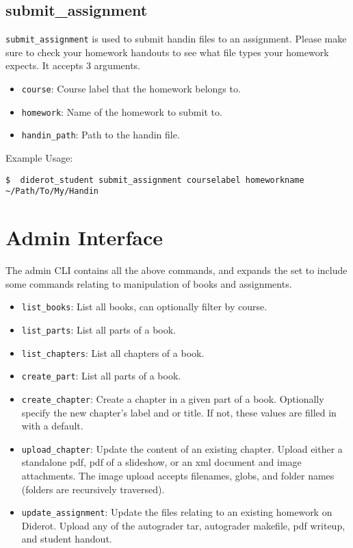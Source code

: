 \subsection{submit\_assignment}

\verb|submit_assignment| is used to submit handin files to an assignment.
%
Please make sure to check your homework handouts to see what file types
your homework expects.
%
It accepts 3 arguments.

\begin{itemize}
  \item \verb|course|: Course label that the homework belongs to.
  \item \verb|homework|: Name of the homework to submit to.
  \item \verb|handin_path|: Path to the handin file.
\end{itemize}

Example Usage:
\begin{verbatim}
$  diderot_student submit_assignment courselabel homeworkname ~/Path/To/My/Handin
\end{verbatim}

\section{Admin Interface}

The admin CLI contains all the above commands, and expands the set to include
some commands relating to manipulation of books and assignments.

\begin{itemize}
  \item \verb|list_books|: List all books, can optionally filter by course.
  \item \verb|list_parts|: List all parts of a book.
  \item \verb|list_chapters|: List all chapters of a book.
  \item \verb|create_part|: List all parts of a book.
  \item \verb|create_chapter|: Create a chapter in a given part of a
    book. Optionally specify the new chapter's label and or title. If
    not, these values are filled in with a default.

  \item \verb|upload_chapter|: Update the content of an existing
    chapter. Upload either a standalone pdf, pdf of a slideshow, or an
    xml document and image attachments.  The image upload accepts
    filenames, globs, and folder names (folders are recursively
    traversed).
  \item \verb|update_assignment|: Update the files relating to an existing homework on Diderot.  Upload any of the autograder tar, autograder makefile, pdf writeup, and student handout.
\end{itemize}

